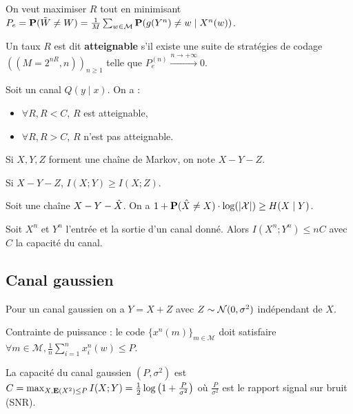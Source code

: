 	On veut maximiser $R$ tout en minimisant $P_e = \mathbf{P}(\Tilde{W} \neq W) = \frac{1}{M} \sum_{w \in \mathcal{M}} \mathbf{P}(g(Y^n) \neq w \mid X^n(w))$.

	\begin{defn}
		Un taux $R$ est dit \textbf{atteignable} s'il existe une suite de stratégies de codage $((M = 2^{nR},n))_{n \geq 1}$ telle que $P_e^{(n)} \overset{n \to +\infty}{\to} 0$.
	\end{defn}

	\begin{thm}
		Soit un canal $Q(y \mid x)$.
		On a :
		\begin{itemize}
			\item[\textbullet] $\forall R, R < C$, $R$ est atteignable,
			\item[\textbullet] $\forall R, R > C$, $R$ n'est pas atteignable.
		\end{itemize}
	\end{thm}

	\begin{note}
		Si $X,Y,Z$ forment une chaîne de Markov, on note $X - Y - Z$.
	\end{note}

	\begin{lem}
		Si $X - Y - Z$, $I(X;Y) \geq I(X;Z)$.
	\end{lem}

	\begin{lem}
		Soit une chaîne $X - Y - \Hat{X}$.
		On a $1 + \mathbf{P}(\Hat{X} \neq X) \cdot \log (\left\lvert\mathcal{X}\right\rvert) \geq H(X \mid Y)$.
	\end{lem}

	\begin{lem}
		Soit $X^n$ et $Y^n$ l'entrée et la sortie d'un canal donné.
		Alors $I(X^n;Y^n) \leq nC$ avec $C$ la capacité du canal.
	\end{lem}


\subsection{Canal gaussien}

	Pour un canal gaussien on a $Y = X + Z$ avec $Z \sim \mathcal{N}(0,\sigma^2)$ indépendant de $X$.
	
	Contrainte de puissance : le code $\{ x^n(m) \}_{m \in \mathcal{M}}$ doit satisfaire $\forall m \in \mathcal{M}, \frac{1}{n} \sum_{i = 1}^n x_i^n(w) \leq P$.
	
	\begin{thm}
		La capacité du canal gaussien $(P,\sigma^2)$ est $C = \max_{X, \mathbf{E}(X^2) \leq P} I(X;Y) = \frac{1}{2} \log \left( 1 + \frac{P}{\sigma^2} \right)$ où $\frac{P}{\sigma^2}$ est le rapport signal sur bruit (SNR).
	\end{thm}



